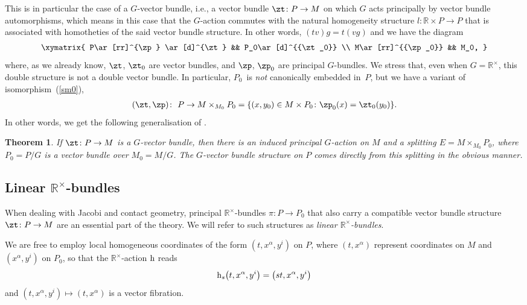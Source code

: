 \documentclass[10pt,a4paper]{amsart}
\newcommand{\rmh}{\textnormal{h}}
\newcommand{\R}{{\mathbb R}}
\newcommand{\ti}{\times}
\numberwithin{equation}{section}
\newtheorem{Theorem}{Theorem}[section]
\begin{document}
This is in particular the case of a $G$-vector bundle, i.e., a vector bundle $\zt\colon P\to M$ on which $G$ acts principally by vector bundle automorphisms, which means in this case that the $G$-action commutes with the natural homogeneity structure ${l} \colon \mathbb{R} \times P \rightarrow P$ that is associated with homotheties of the said vector bundle structure. In other words, $(tv)g=t(vg)$ and we have the diagram
\begin{gather*}%
\xymatrix{
P\ar[rr]^{\zp} \ar[d]^{\zt} && P_0\ar[d]^{{\zt_0}} \\
M\ar[rr]^{{\zp_0}} && M_0, }
\end{gather*}
where, as we already know, $\zt$, $\zt_0$ are vector bundles, and $\zp$, $\zp_0$ are principal $G$-bundles. We stress that, even when $G =\R^\ti$, this double structure is not a double vector bundle. In particular, $P_{0}$~is \emph{not} canonically embedded in~$P$, but we have a variant of isomorphism~(\ref{sm0}),
\begin{gather}\label{ident}
(\zt,\zp)\colon \ P\to M\ti_{M_0}P_0=\{(x,y_0)\in M\ti P_0\colon \zp_0(x)=\zt_0(y_0)\}.
\end{gather}
In other words, we get the following generalisation of \cite[Theorem~3.2]{Grabowski2013}.
\begin{Theorem} If $\zt\colon P\to M$ is a $G$-vector bundle, then there is an induced principal $G$-action on $M$ and a splitting $E=M\ti_{M_0}P_0$, where $P_0=P/G$ is a vector bundle over $M_0=M/G$. The $G$-vector bundle structure on $P$ comes directly from this splitting in the obvious manner.
\end{Theorem}

\subsection[Linear $\R^\ti$-bundles]{Linear $\boldsymbol{\R^\ti}$-bundles}
When dealing with Jacobi and contact geometry, principal $\mathbb{R}^{\times}$-bundles $\pi \colon P\rightarrow P_{0} $ that also carry a compatible vector bundle structure $\zt\colon P\to M$ are an essential part of the theory. We will refer to such structures as \emph{linear $\R^\ti$-bundles}.

We are free to employ local homogeneous coordinates of the form $(t, x^{\alpha}, y^{i})$ on $P$, where $(t, x^{\alpha})$ represent coordinates on $M$ and $(x^{\alpha}, y^{i})$ on $P_{0}$, so that the $\R^\ti$-action $\rmh$ reads
\begin{gather*}%
\rmh_s\big(t, x^{\alpha}, y^{i}\big)=\big(s t, x^{\alpha}, y^{i}\big)
\end{gather*}
 and $(t, x^{\alpha}, y^{i})\mapsto (t, x^{\alpha})$ is a vector f\/ibration.
\end{document}
